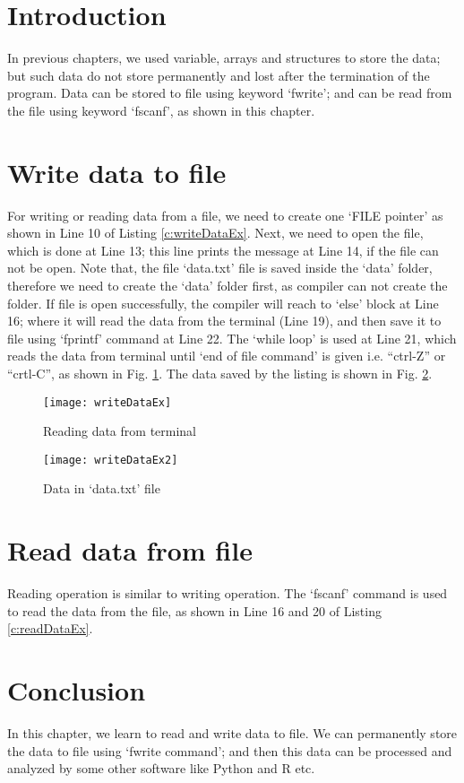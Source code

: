 \section{Introduction}
In previous chapters, we used variable, arrays and structures to store the data; but such data do not store permanently and lost after the termination of the program. Data can be stored to file using keyword `fwrite'; and can be read from the file using keyword `fscanf', as shown in this chapter. 


\section{Write data to file}
For writing or reading data from a file, we need to create one `FILE pointer' as shown in Line 10 of Listing \ref{c:writeDataEx}. Next, we need to open the file, which is done at Line 13; this line prints the message at Line 14, if the file can not be open. Note that, the file `data.txt' file is saved inside the `data' folder, therefore we need to create the `data' folder first, as compiler can not create the folder. If file is open successfully, the compiler will reach to `else' block at Line 16; where it will read the data from the terminal (Line 19), and then save it to file using `fprintf' command at Line 22. The `while loop' is used at Line 21, which reads the data from terminal until `end of file command' is given i.e. ``ctrl-Z'' or ``crtl-C'', as shown in Fig. \ref{fig:writeDataEx}. The data saved by the listing is shown in Fig. \ref{fig:writeDataEx2}. 




\begin{figure}[!h]
	\centering
	\texttt{[image: writeDataEx]}
	\caption{Reading data from terminal}
	\label{fig:writeDataEx}
\end{figure}

\begin{figure}[!h]
	\centering
	\texttt{[image: writeDataEx2]}
	\caption{Data in `data.txt' file}
	\label{fig:writeDataEx2}
\end{figure}

\section{Read data from file}
Reading operation is similar to writing operation. The `fscanf' command is used to read the data from the file, as shown in Line 16 and 20 of Listing \ref{c:readDataEx}. 



\section{Conclusion}
In this chapter, we learn to read and write data to file. We can permanently store the data to file using `fwrite command'; and then this data can be processed and analyzed by some other software like Python and R etc. 